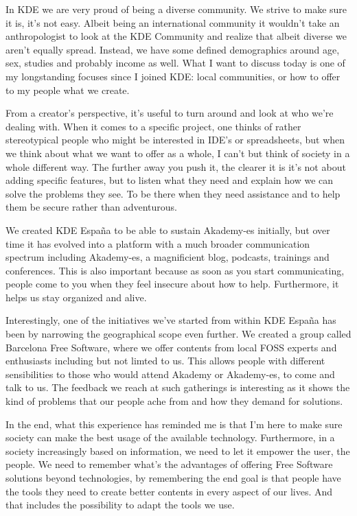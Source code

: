 

\noindent{}In KDE we are very proud of being a diverse community. We strive to make sure it is, it's not easy. Albeit being an international community it wouldn't take an anthropologist to look at the KDE Community and realize that albeit diverse we aren't equally spread. Instead, we have some defined demographics around age, sex, studies and probably income as well. What I want to discuss today is one of my longstanding focuses since I joined KDE: local communities, or how to offer to my people what we create.

From a creator's perspective, it's useful to turn around and look at who we're dealing with. When it comes to a specific project, one thinks of rather stereotypical people who might be interested in IDE's or spreadsheets, but when we think about what we want to offer as a whole, I can't but think of society in a whole different way. The further away you push it, the clearer it is it's not about adding specific features, but to listen what they need and explain how we can solve the problems they see. To be there when they need assistance and to help them be secure rather than adventurous.

We created KDE España to be able to sustain Akademy-es initially, but over time it has evolved into a platform with a much broader communication spectrum including Akademy-es, a magnificient blog, podcasts, trainings and conferences. This is also important because as soon as you start communicating, people come to you when they feel insecure about how to help. Furthermore, it helps us stay organized and alive.

Interestingly, one of the initiatives we've started from within KDE España has been by narrowing the geographical scope even further. We created a group called Barcelona Free Software, where we offer contents from local FOSS experts and enthusiasts including but not limted to us. This allows people with different sensibilities to those who would attend Akademy or Akademy-es, to come and talk to us. The feedback we reach at such gatherings is interesting as it shows the kind of problems that our people ache from and how they demand for solutions.

In the end, what this experience has reminded me is that I'm here to make sure society can make the best usage of the available technology. Furthermore, in a society increasingly based on information, we need to let it empower the user, the people. We need to remember what's the advantages of offering Free Software solutions beyond technologies, by remembering the end goal is that people have the tools they need to create better contents in every aspect of our lives. And that includes the possibility to adapt the tools we use.

